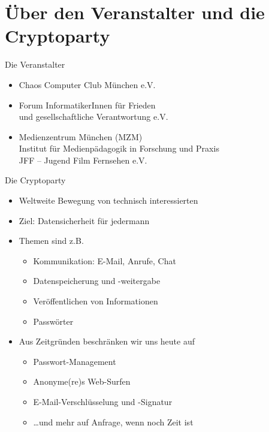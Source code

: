 \section{Über den Veranstalter und die Cryptoparty}
  \begin{frame}{Die Veranstalter}
    \begin{itemize}
      \item Chaos Computer Club München e.V.
      \item Forum InformatikerInnen für Frieden\\und gesellschaftliche Verantwortung e.V.
      \item Medienzentrum München (MZM)\\Institut für Medienpädagogik in Forschung und Praxis\\JFF -- Jugend Film Fernsehen e.V.
    \end{itemize}
  \end{frame}
  \begin{frame}{Die Cryptoparty}
    \begin{itemize}
      \item Weltweite Bewegung von technisch interessierten
      \item Ziel: Datensicherheit für jedermann
      \item Themen sind z.B.
      \begin{itemize}
        \item Kommunikation: E-Mail, Anrufe, Chat
        \item Datenspeicherung und -weitergabe
        \item Veröffentlichen von Informationen
        \item Passwörter
      \end{itemize}
      \item Aus Zeitgründen beschränken wir uns heute auf 
      \begin{itemize}
        \item Passwort-Management
        \item Anonyme(re)s Web-Surfen
        \item E-Mail-Verschlüsselung und -Signatur
        \item \ldots und mehr auf Anfrage, wenn noch Zeit ist
      \end{itemize}
    \end{itemize}
  \end{frame}

